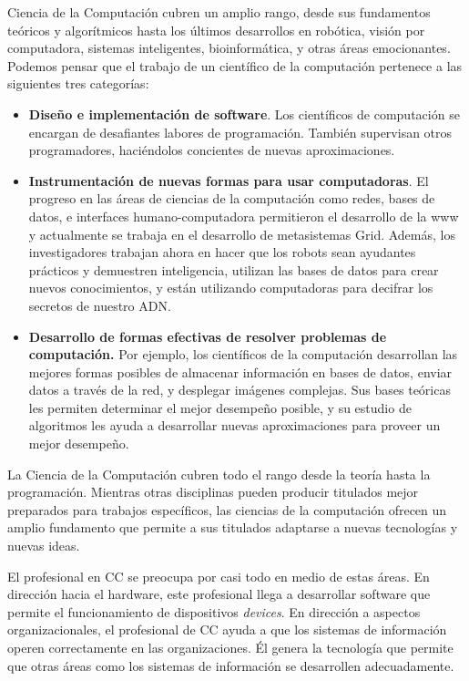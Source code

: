 Ciencia de la Computación cubren un amplio rango, desde sus fundamentos teóricos y algorí­tmicos hasta 
los \'ultimos desarrollos en robótica, visión por computadora, sistemas inteligentes, bioinformática, y
otras áreas emocionantes. Podemos pensar que el trabajo de un cientí­fico de la computación pertenece
a las siguientes tres categorí­as:

\begin{itemize}
\item \textbf{Diseño e implementación de software}. Los cientí­ficos de computación se encargan de
desafiantes labores de programación. También supervisan otros programadores, haciéndolos concientes
de nuevas aproximaciones.

\item \textbf{Instrumentación de nuevas formas para usar computadoras}. El progreso en las áreas
de ciencias de la computación como redes, bases de datos, e interfaces humano-computadora permitieron
el desarrollo de la www y actualmente se trabaja en el desarrollo de metasistemas Grid. Además,
los investigadores trabajan ahora en hacer que los robots sean ayudantes prácticos y demuestren
inteligencia, utilizan las bases de datos para crear nuevos conocimientos, y están utilizando
computadoras para decifrar los secretos de nuestro ADN.

\item \textbf{Desarrollo de formas efectivas de resolver problemas de computación.}
Por ejemplo, los cientí­ficos de la computación desarrollan las mejores formas posibles
de almacenar información en bases de datos, enviar datos a través de la red, y
desplegar imágenes complejas. Sus bases teóricas les permiten determinar el
mejor desempeño posible, y su estudio de algoritmos les ayuda a desarrollar
nuevas aproximaciones para proveer un mejor desempeño.
\end{itemize}

La Ciencia de la Computación cubren todo el rango desde la teorí­a hasta la programación. Mientras otras disciplinas pueden producir titulados mejor preparados para trabajos especí­ficos, las ciencias de la computación ofrecen un amplio fundamento que permite a sus titulados adaptarse a nuevas tecnologí­as y nuevas ideas.

El profesional en \ac{CC} se preocupa por casi todo en medio de estas áreas. En dirección hacia el hardware, este profesional llega a desarrollar software que permite el funcionamiento de dispositivos {\it devices}. En dirección a aspectos organizacionales, el profesional de \ac{CC} ayuda a que los sistemas de información operen correctamente en las organizaciones. Él genera la tecnologí­a que permite que otras áreas como los sistemas de información se desarrollen adecuadamente.


